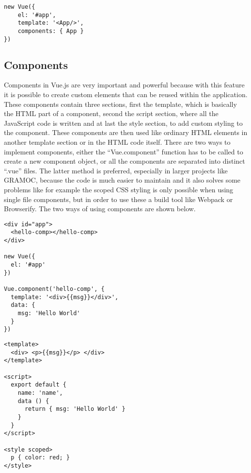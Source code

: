 \begin{minipage}{\linewidth}
\begin{lstlisting}[caption={Creating a Vue instance}, label=lst:vue-instance, captionpos=b, style=htmlcssjs]
new Vue({
    el: '#app',
    template: '<App/>',
    components: { App }
})
\end{lstlisting}
\end{minipage}

\subsection{Components}
Components in Vue.js are very important and powerful because with this feature it is possible to create custom elements that can be reused within the application. These components contain three sections, first the template, which is basically the HTML part of a component, second the script section, where all the JavaScript code is written and at last the style section, to add custom styling to the component. These components are then used like ordinary HTML elements in another template section or in the HTML code itself. There are two ways to implement components, either the ``Vue.component'' function has to be called to create a new component object, or all the components are separated into distinct ``.vue'' files. The latter method is preferred, especially in larger projects like GRAMOC, because the code is much easier to maintain and it also solves some problems like for example the scoped CSS styling is only possible when using single file components, but in order to use these a build tool like Webpack or Browserify. The two ways of using components are shown below.

\noindent\begin{minipage}{.45\textwidth}
\begin{lstlisting}[caption={Creating a Vue instance and adding a component to it}, label=lst:vue-component, captionpos=b, style=htmlcssjs]
<div id="app">
  <hello-comp></hello-comp>
</div>

new Vue({
  el: '#app'
})

Vue.component('hello-comp', {
  template: '<div>{{msg}}</div>',
  data: {
    msg: 'Hello World'
  }
})
\end{lstlisting}
\end{minipage}\hfill
\begin{minipage}{.45\textwidth}
\begin{lstlisting}[caption={Example for a simple single file component}, label=lst:vue-sf-component, captionpos=b, style=htmlcssjs]
<template>
  <div> <p>{{msg}}</p> </div>
</template>

<script>
  export default {
    name: 'name',
    data () {
      return { msg: 'Hello World' }
    }
  }
</script>

<style scoped>
  p { color: red; }
</style>
\end{lstlisting}
\end{minipage}

